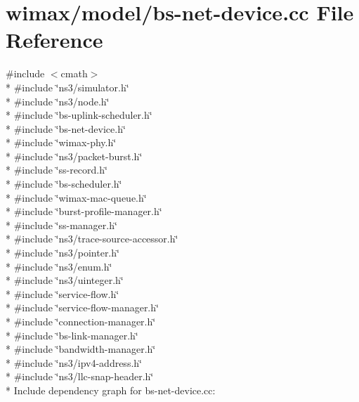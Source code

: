\hypertarget{bs-net-device_8cc}{}\section{wimax/model/bs-\/net-\/device.cc File Reference}
\label{bs-net-device_8cc}
{\ttfamily \#include $<$cmath$>$}\\*
{\ttfamily \#include \char`\"{}ns3/simulator.\+h\char`\"{}}\\*
{\ttfamily \#include \char`\"{}ns3/node.\+h\char`\"{}}\\*
{\ttfamily \#include \char`\"{}bs-\/uplink-\/scheduler.\+h\char`\"{}}\\*
{\ttfamily \#include \char`\"{}bs-\/net-\/device.\+h\char`\"{}}\\*
{\ttfamily \#include \char`\"{}wimax-\/phy.\+h\char`\"{}}\\*
{\ttfamily \#include \char`\"{}ns3/packet-\/burst.\+h\char`\"{}}\\*
{\ttfamily \#include \char`\"{}ss-\/record.\+h\char`\"{}}\\*
{\ttfamily \#include \char`\"{}bs-\/scheduler.\+h\char`\"{}}\\*
{\ttfamily \#include \char`\"{}wimax-\/mac-\/queue.\+h\char`\"{}}\\*
{\ttfamily \#include \char`\"{}burst-\/profile-\/manager.\+h\char`\"{}}\\*
{\ttfamily \#include \char`\"{}ss-\/manager.\+h\char`\"{}}\\*
{\ttfamily \#include \char`\"{}ns3/trace-\/source-\/accessor.\+h\char`\"{}}\\*
{\ttfamily \#include \char`\"{}ns3/pointer.\+h\char`\"{}}\\*
{\ttfamily \#include \char`\"{}ns3/enum.\+h\char`\"{}}\\*
{\ttfamily \#include \char`\"{}ns3/uinteger.\+h\char`\"{}}\\*
{\ttfamily \#include \char`\"{}service-\/flow.\+h\char`\"{}}\\*
{\ttfamily \#include \char`\"{}service-\/flow-\/manager.\+h\char`\"{}}\\*
{\ttfamily \#include \char`\"{}connection-\/manager.\+h\char`\"{}}\\*
{\ttfamily \#include \char`\"{}bs-\/link-\/manager.\+h\char`\"{}}\\*
{\ttfamily \#include \char`\"{}bandwidth-\/manager.\+h\char`\"{}}\\*
{\ttfamily \#include \char`\"{}ns3/ipv4-\/address.\+h\char`\"{}}\\*
{\ttfamily \#include \char`\"{}ns3/llc-\/snap-\/header.\+h\char`\"{}}\\*
Include dependency graph for bs-\/net-\/device.cc\+:
